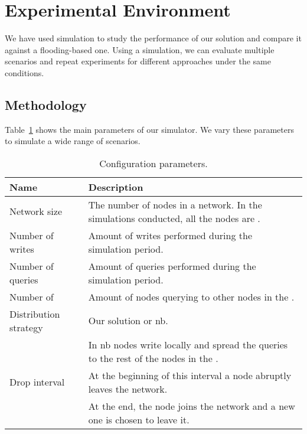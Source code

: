\section{Experimental Environment}
\label{environment}
We have used simulation to study the performance of our solution and compare it against a flooding-based one.
Using a simulation, we can evaluate multiple scenarios and repeat experiments for different approaches under the same conditions.

\subsection{Methodology}
Table~\ref{tab:configurationParameters} shows the main parameters of our simulator.
We vary these parameters to simulate a wide range of scenarios.


\begin{table}
  \centering
    \begin{tabular}{l p{7cm}}
      \hline
      Name & Description \\
      \hline
      Network size & The number of nodes in a network. In the simulations conducted, all the nodes are \providers{}. \\
      Number of writes & Amount of writes performed during the simulation period. \\
      Number of queries & Amount of queries performed during the simulation period. \\
      Number of \consumers{} & Amount of nodes querying to other nodes in the \Space{}. \\
      Distribution strategy & Our solution or \ac{nb}. \\
      & In \ac{nb} nodes write locally and spread the queries to the rest of the nodes in the \Space{}. \\
      Drop interval & At the beginning of this interval a node abruptly leaves the network. \\
      & At the end, the node joins the network and a new one is chosen to leave it. \\
      \hline
    \end{tabular}
    \caption {Configuration parameters.}
  \label{tab:configurationParameters}
\end{table}

